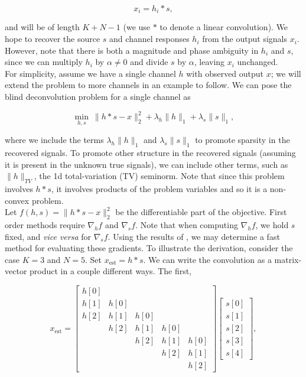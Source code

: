 \documentclass[journal]{IEEEtran}
\begin{document}
\[ x_i = h_i\ast s, \] 

\noindent and will be of length $K+N-1$ (we use $\ast$ to denote a linear convolution).  We hope to recover the source $s$ and channel responses $h_i$ from the output signals $x_i$.   However, note that there is both a magnitude and phase ambiguity in $h_i$ and $s$, since we can multiply $h_i$ by $\alpha\neq 0$ and divide $s$ by $\alpha$, leaving $x_i$ unchanged.\\

For simplicity, assume we have a single channel $h$ with observed output $x$; we will extend the problem to more channels in an example to follow.  We can pose the blind deconvolution problem for a single channel as

\[ \min_{h,s}~ \|h\ast s-x\|_2^2 + \lambda_h\|h\|_1 + \lambda_s \|s\|_1, \] 

\noindent where we include the terms $\lambda_h\|h\|_1$ and $\lambda_s\|s\|_1$ to promote sparsity in the recovered signals.  To promote other structure in the recovered signals (assuming it is present in the unknown true signals), we can include other terms, such as $\|h\|_{TV}$, the 1d total-variation (TV) seminorm.  Note that since this problem involves $h\ast s$, it involves products of the problem variables and so it is a non-convex problem.\\

Let $f(h,s)=\|h\ast s -x\|_2^2$ be the differentiable part of the objective.  First order methods require $\nabla_hf$ and $\nabla_sf$.  Note that when computing $\nabla_hf$, we hold $s$ fixed, and \emph{vice versa} for $\nabla_sf$.  Using the results of \cite{claerbout_1992}, we may determine a fast method for evaluating these gradients.  To illustrate the derivation, consider the case $K=3$ and $N=5$.  Set $x_\text{est}=h\ast s$.  We can write the convolution as a matrix-vector product in a couple different ways.  The first,

\[ x_\text{est} = \begin{bmatrix} h[0]\\h[1]&h[0]\\h[2]&h[1]&h[0]\\&h[2]&h[1]&h[0]\\&&h[2]&h[1]&h[0]\\&&&h[2]&h[1]\\&&&&h[2]\end{bmatrix}\begin{bmatrix}s[0]\\s[1]\\s[2]\\s[3]\\s[4]\end{bmatrix}, \] 
\end{document}
